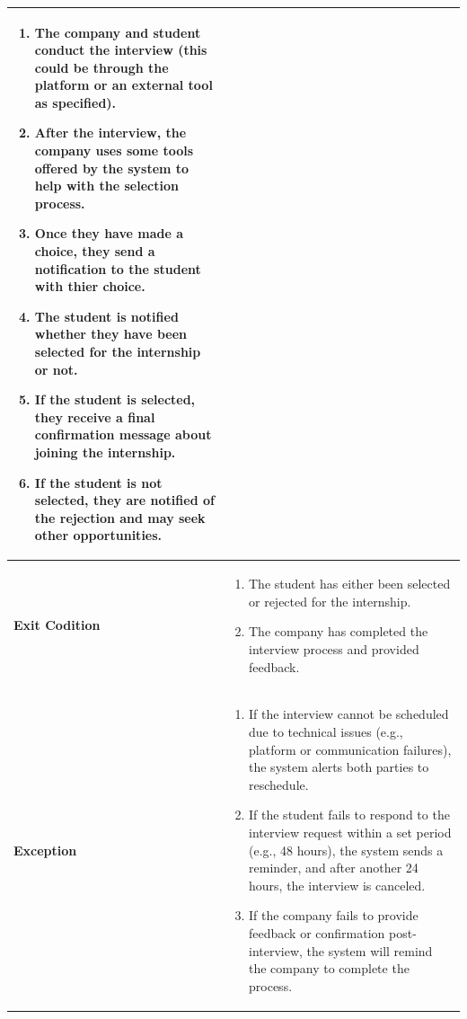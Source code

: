 \begin{longtable}{|p{}|p{}|}
\begin{enumerate}
    \item The company and student conduct the interview (this could be through the platform or an external tool as specified).
    \item After the interview, the company uses some tools offered by the system to help with the selection process.
    \item Once they have made a choice, they send a notification to the student with thier choice.
    \item The student is notified whether they have been selected for the internship or not.
    \item If the student is selected, they receive a final confirmation message about joining the internship.
    \item If the student is not selected, they are notified of the rejection and may seek other opportunities.
\end{enumerate} \\
\hline
\textbf{Exit Codition} &  
\begin{enumerate}
    \item The student has either been selected or rejected for the internship.
    \item The company has completed the interview process and provided feedback.
\end{enumerate}\\
\hline
\textbf{Exception} &  
\begin{enumerate}
    \item If the interview cannot be scheduled due to technical issues (e.g., platform or communication failures), the system alerts both parties to reschedule.
    \item If the student fails to respond to the interview request within a set period (e.g., 48 hours), the system sends a reminder, and after another 24 hours, the interview is canceled.
    \item If the company fails to provide feedback or confirmation post-interview, the system will remind the company to complete the process.
\end{enumerate} \\
\hline
\end{longtable}

